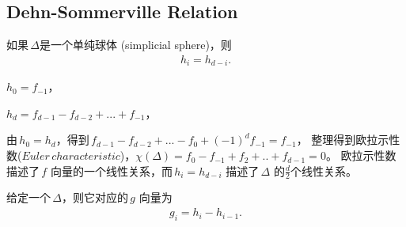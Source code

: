 \subsection{Dehn-Sommerville Relation }
\begin{df}
如果\,$\Delta$是一个单纯球体 (simplicial sphere)，则
\begin{align}
h_{i}=h_{d-i}.
\label{eq14}
\end{align}
\end{df}

\begin{example}
$h_{0}=f_{-1}$，\par
$h_{d}=f_{d-1}-f_{d-2}+...+f_{-1}$，\par
由\,$h_{0}=h_{d}$，得到\,$f_{d-1}-f_{d-2}+...-f_{0}+(-1)^{d}f_{-1}=f_{-1}$，
整理得到欧拉示性数($Euler \,characteristic$)，$\chi(\Delta)=f_{0}-f_{-1}+f_{2}+..+f_{d-1}=0$。
欧拉示性数描述了\,$f$ 向量的一个线性关系，而$\,h_{i}=h_{d-i}$ 描述了\,$\Delta$ 的$\frac{d}{2}$个线性关系。
\end{example}
\begin{df}
给定一个$\,\Delta$，则它对应的\,$g$ 向量为
\begin{align}
g_{i}=h_{i}-h_{i-1}.
\label{eq15}
\end{align}
\end{df}
